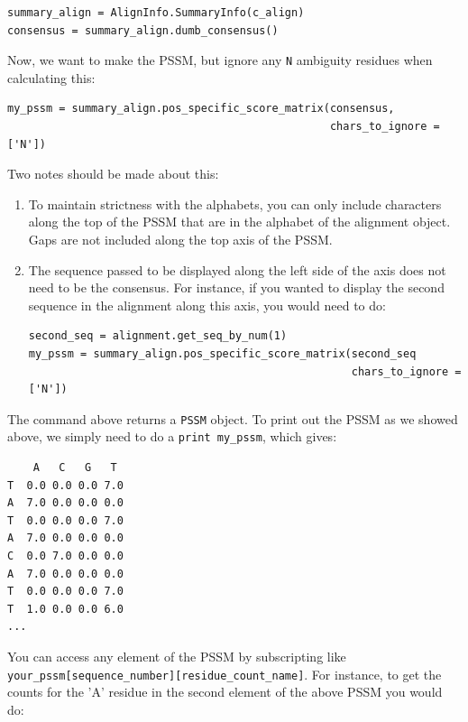 \documentclass{report}
\begin{document}
\begin{verbatim}
summary_align = AlignInfo.SummaryInfo(c_align)
consensus = summary_align.dumb_consensus()
\end{verbatim}

Now, we want to make the PSSM, but ignore any \verb|N| ambiguity residues when calculating this:

\begin{verbatim}
my_pssm = summary_align.pos_specific_score_matrix(consensus,
                                                  chars_to_ignore = ['N'])
\end{verbatim}

Two notes should be made about this:

\begin{enumerate}
  \item To maintain strictness with the alphabets, you can only include characters along the top of the PSSM that are in the alphabet of the alignment object. Gaps are not included along the top axis of the PSSM.

  \item The sequence passed to be displayed along the left side of the axis does not need to be the consensus. For instance, if you wanted to display the second sequence in  the alignment along this axis, you would need to do:

\begin{verbatim}
second_seq = alignment.get_seq_by_num(1)
my_pssm = summary_align.pos_specific_score_matrix(second_seq
                                                  chars_to_ignore = ['N'])
\end{verbatim}

\end{enumerate}

The command above returns a \verb|PSSM| object. To print out the PSSM as we showed above, we simply need to do a \verb|print my_pssm|, which gives:

\begin{verbatim}
    A   C   G   T
T  0.0 0.0 0.0 7.0
A  7.0 0.0 0.0 0.0
T  0.0 0.0 0.0 7.0
A  7.0 0.0 0.0 0.0
C  0.0 7.0 0.0 0.0
A  7.0 0.0 0.0 0.0
T  0.0 0.0 0.0 7.0
T  1.0 0.0 0.0 6.0
...
\end{verbatim}

You can access any element of the PSSM by subscripting like \verb|your_pssm[sequence_number][residue_count_name]|. For instance, to get the counts for the 'A' residue in the second element of the above PSSM you would do:
\end{document}
